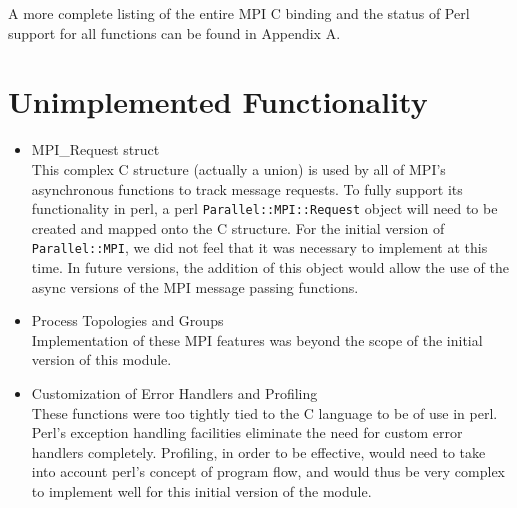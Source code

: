 \documentclass{report}
\begin{document}
A more complete listing of the entire MPI C binding and the status of
Perl support for all functions can be found in Appendix A.

\section*{Unimplemented Functionality}

\begin{itemize}
\item MPI\_Request struct\\
	This complex C structure (actually a union) is used by all of
MPI's asynchronous functions to track message requests.  To fully
support its functionality in perl, a perl
\verb|Parallel::MPI::Request| object will need to be created and
mapped onto the C structure.  For the initial version of
\verb|Parallel::MPI|, we did not feel that it was necessary to
implement at this time.  In future versions, the addition of this
object would allow the use of the async versions of the MPI message
passing functions.

\item Process Topologies and Groups\\
	Implementation of these MPI features was beyond the scope of
the initial version of this module.

\item Customization of Error Handlers and Profiling\\
	These functions were too tightly tied to the C language to be
of use in perl.  Perl's exception handling facilities eliminate the
need for custom error handlers completely.  Profiling, in order to be
effective, would need to take into account perl's concept of program
flow, and would thus be very complex to implement well for this 
initial version of the module.
	
\end{itemize}

\end{document}
